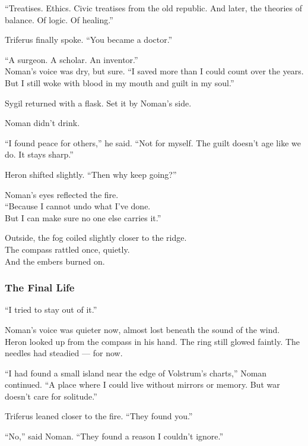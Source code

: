\documentclass[12pt]{article}
\begin{document}
“Treatises. Ethics. Civic treatises from the old republic. And later, the theories of balance. Of logic. Of healing.”

Triferus finally spoke. “You became a doctor.”

“A surgeon. A scholar. An inventor.”\\
Noman’s voice was dry, but sure. “I saved more than I could count over the years. But I still woke with blood in my mouth and guilt in my soul.”

\vspace{1em}

Sygil returned with a flask. Set it by Noman’s side.

Noman didn’t drink.

“I found peace for others,” he said. “Not for myself. The guilt doesn’t age like we do. It stays sharp.”

Heron shifted slightly. “Then why keep going?”

\vspace{1em}

Noman’s eyes reflected the fire.\\
“Because I cannot undo what I’ve done.\\
But I can make sure no one else carries it.”

\vspace{1em}

Outside, the fog coiled slightly closer to the ridge.\\
The compass rattled once, quietly.\\
And the embers burned on.

\dotfill

\subsubsection*{The Final Life}

“I tried to stay out of it.”

Noman’s voice was quieter now, almost lost beneath the sound of the wind.\\
Heron looked up from the compass in his hand. The ring still glowed faintly. The needles had steadied — for now.

“I had found a small island near the edge of Volstrum’s charts,” Noman continued. “A place where I could live without mirrors or memory. But war doesn’t care for solitude.”

Triferus leaned closer to the fire. “They found you.”

“No,” said Noman. “They found a reason I couldn’t ignore.”
\end{document}
